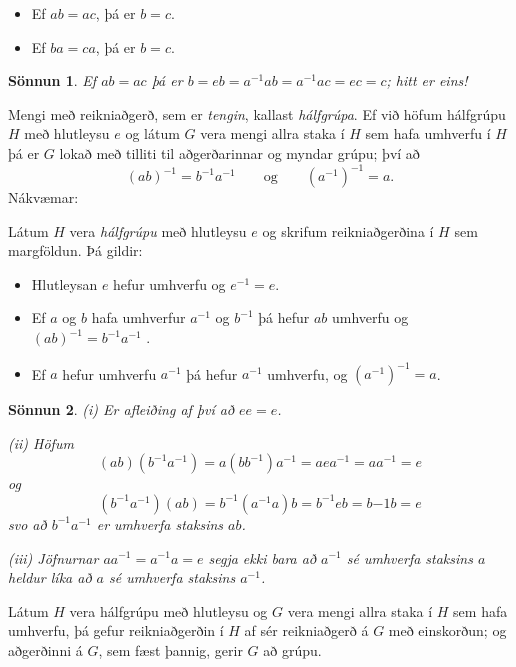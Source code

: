 \documentclass[a4paper,icelandic,11pt]{book}
\theoremstyle{plain}
\newtheorem*{sonnun}{Sönnun}
\begin{document}
\begin{setn}
  [Styttireglur]
  \begin{itemize}
    \item [(i)] Ef $ab=ac$, þá er $b = c$.
    \item [(ii)] Ef $ba = ca$, þá er $b = c$.
  \end{itemize}
\end{setn}
\begin{sonnun}
  Ef $ab = ac$ þá er $ b = eb = a^{-1} ab = a^{-1}ac = ec = c$; hitt er eins!
\end{sonnun}
Mengi með reikniaðgerð, sem er \emph{tengin},
kallast \emph{hálfgrúpa}. Ef
við höfum hálfgrúpu $H$ með hlutleysu $e$ og látum $G$ vera mengi allra
staka í $H$ sem hafa umhverfu í $H$ þá er $G$ lokað með tilliti til
aðgerðarinnar og myndar grúpu; því að
\[ (ab)^{-1} = b^{-1} a^{-1} \qquad \text{og} \qquad (a^{-1})^{-1} = a. \]
Nákvæmar:
\begin{setn}
  Látum $H$ vera \emph{hálfgrúpu} með hlutleysu $e$ og skrifum reikniaðgerðina í
  $H$ sem margföldun. Þá gildir:
  \begin{itemize}
    \item [(i)] Hlutleysan $e$ hefur umhverfu og $e^{-1} = e$.
    \item [(ii)] Ef $a$ og $b$ hafa umhverfur $a^{-1}$ og $b^{-1}$ þá hefur $ab$
      umhverfu og $(ab)^{-1} = b^{-1}a^{-1}$ .
    \item [(iii)] Ef $a$ hefur umhverfu $a^{-1}$ þá hefur $a^{-1}$ umhverfu, og
      $\left(a^{-1}\right)^{-1} = a$.
  \end{itemize}
\end{setn}
\begin{sonnun}
  (i) Er afleiðing af því að $ee=e$.

  (ii) Höfum
  \[ (ab)(b^{-1}a^{-1}) = a(bb^{-1})a^{-1} = aea^{-1} = aa^{-1} = e \]
  og
  \[ (b^{-1}a^{-1}) (ab) = b^{-1}(a^{-1}a)b = b^{-1}eb = b{-1}b = e \]
  svo að $b^{-1}a^{-1}$ er umhverfa staksins $ab$.

  (iii) Jöfnurnar $aa^{-1} = a^{-1}a = e$ segja ekki bara að $a^{-1}$ sé
  umhverfa staksins $a$ heldur líka að $a$ sé umhverfa staksins $a^{-1}$.
\end{sonnun}
\begin{fylgisetn}
  Látum $H$ vera hálfgrúpu með hlutleysu og $G$ vera mengi allra staka í $H$
  sem hafa umhverfu, þá gefur reikniaðgerðin í $H$ af sér reikniaðgerð á $G$
  með einskorðun; og aðgerðinni á $G$, sem fæst þannig, gerir $G$ að grúpu.
\end{fylgisetn}
\end{document}

